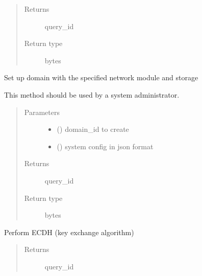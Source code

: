 \documentclass[letterpaper,10pt,english]{sphinxmanual}
\begin{document}
\begin{fulllineitems}
\begin{fulllineitems}
\begin{quote}
\begin{description}
\item[{Returns}] \leavevmode
query\_id

\item[{Return type}] \leavevmode
bytes

\end{description}\end{quote}

\end{fulllineitems}


\begin{fulllineitems}
\label{\detokenize{bbc1.core.bbc_app:bbc1.core.bbc_app.BBcAppClient.domain_setup}}
Set up domain with the specified network module and storage

This method should be used by a system administrator.
\begin{quote}\begin{description}
\item[{Parameters}] \leavevmode\begin{itemize}
\item {} 
 () \textendash{} domain\_id to create

\item {} 
 () \textendash{} system config in json format

\end{itemize}

\item[{Returns}] \leavevmode
query\_id

\item[{Return type}] \leavevmode
bytes

\end{description}\end{quote}

\end{fulllineitems}


\begin{fulllineitems}
\label{\detokenize{bbc1.core.bbc_app:bbc1.core.bbc_app.BBcAppClient.exchange_key}}
Perform ECDH (key exchange algorithm)
\begin{quote}\begin{description}
\item[{Returns}] \leavevmode
query\_id


\end{description}
\end{quote}
\end{fulllineitems}
\end{fulllineitems}
\end{document}
